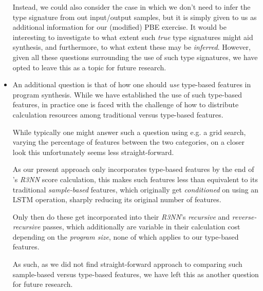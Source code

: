 \documentclass{article}
\begin{document}
\begin{itemize}
    Instead, we could also consider the case in which we don't need to infer the type signature from out input/output samples,
    but it is simply given to us as additional information for our (modified) PBE exercise.
    It would be interesting to investigate to what extent such \emph{true} type signatures
    might aid synthesis, and furthermore, to what extent these may be \emph{inferred}.
    However, given all these questions surrounding the use of such type signatures,
    we have opted to leave this as a topic for future research.

    \item An additional question is that of how one should \emph{use} type-based features in program synthesis.
    While we have established the use of such type-based features,
    in practice one is faced with the challenge of how to distribute calculation resources among traditional versus type-based features.

    While typically one might answer such a question using e.g. a grid search,
    varying the percentage of features between the two categories,
    on a closer look this unfortunately seems less straight-forward.

    As our present approach only incorporates type-based features by the end of \citet{nsps}'s \emph{R3NN} score calculation,
    this makes such features less than equivalent to its traditional \emph{sample-based} features,
    which originally get \emph{conditioned} on using an LSTM operation,
    sharply reducing its original number of features.

    Only then do these get incorporated into their \emph{R3NN}'s \emph{recursive} and \emph{reverse-recursive} passes,
    which additionally are variable in their calculation cost depending on the \emph{program size},
    none of which applies to our type-based features.

    As such, as we did not find straight-forward approach to comparing such sample-based versus type-based features,
    we have left this as another question for future research.

    
\end{itemize}


\nocite{*}
% 

\end{document}
